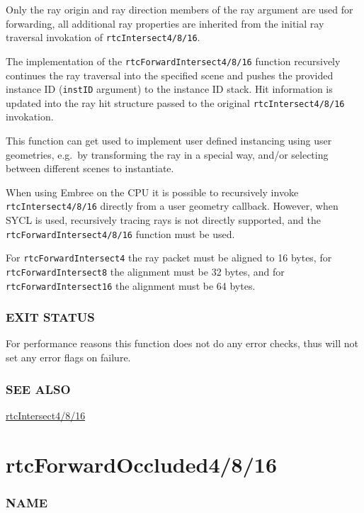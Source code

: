 Only the ray origin and ray direction members of the ray argument are
used for forwarding, all additional ray properties are inherited from
the initial ray traversal invokation of \texttt{rtcIntersect4/8/16}.

The implementation of the \texttt{rtcForwardIntersect4/8/16} function
recursively continues the ray traversal into the specified scene and
pushes the provided instance ID (\texttt{instID} argument) to the
instance ID stack. Hit information is updated into the ray hit structure
passed to the original \texttt{rtcIntersect4/8/16} invokation.

This function can get used to implement user defined instancing using
user geometries, e.g.~by transforming the ray in a special way, and/or
selecting between different scenes to instantiate.

When using Embree on the CPU it is possible to recursively invoke
\texttt{rtcIntersect4/8/16} directly from a user geometry callback.
However, when SYCL is used, recursively tracing rays is not directly
supported, and the \texttt{rtcForwardIntersect4/8/16} function must be
used.

For \texttt{rtcForwardIntersect4} the ray packet must be aligned to 16
bytes, for \texttt{rtcForwardIntersect8} the alignment must be 32 bytes,
and for \texttt{rtcForwardIntersect16} the alignment must be 64 bytes.

\subsubsection{EXIT STATUS}\label{exit-status}

For performance reasons this function does not do any error checks, thus
will not set any error flags on failure.

\subsubsection{SEE ALSO}\label{see-also}

\hyperref[rtcintersect4816]{rtcIntersect4/8/16}

\pagebreak

\section{rtcForwardOccluded4/8/16}\label{rtcforwardoccluded4816}

\subsubsection{NAME}\label{name}

